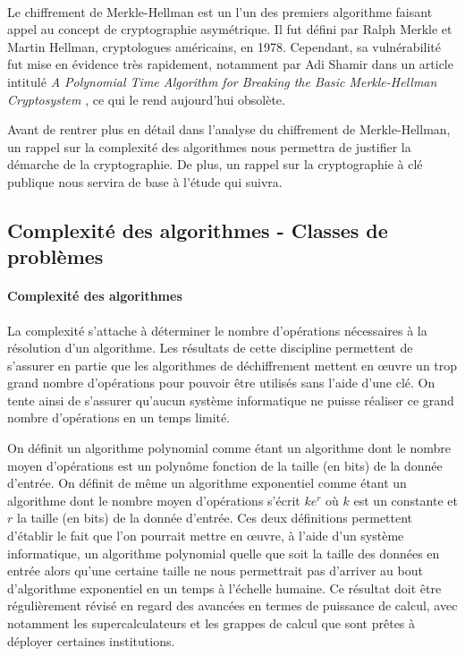 \documentclass[a4paper,10pt]{article}
\begin{document}
\paragraph{} Le chiffrement de Merkle-Hellman est un l'un des premiers algorithme faisant appel au concept de cryptographie asymétrique. Il fut défini par Ralph Merkle et Martin Hellman, cryptologues américains, en 1978. Cependant, sa vulnérabilité fut mise en évidence très rapidement, notamment par Adi Shamir dans un article intitulé \textit{A Polynomial Time Algorithm for Breaking the Basic Merkle-Hellman Cryptosystem} \cite{1056964}, ce qui le rend aujourd'hui obsolète.

Avant de rentrer plus en détail dans l'analyse du chiffrement de Merkle-Hellman, un rappel sur la complexité des algorithmes nous permettra de justifier la démarche de la cryptographie. De plus, un rappel sur la cryptographie à clé publique nous servira de base à l'étude qui suivra.

\subsection*{Complexité des algorithmes - Classes de problèmes}

\paragraph{Complexité des algorithmes} La complexité s'attache à déterminer le nombre d'opérations nécessaires à la résolution d'un algorithme. Les résultats de cette discipline permettent de s'assurer en partie que les algorithmes de déchiffrement mettent en œuvre un trop grand nombre d'opérations pour pouvoir être utilisés sans l'aide d'une clé. On tente ainsi de s'assurer qu'aucun système informatique ne puisse réaliser ce grand nombre d'opérations en un temps limité.

On définit un algorithme polynomial comme étant un algorithme dont le nombre moyen d'opérations est un polynôme fonction de la taille (en bits) de la donnée d'entrée. On définit de même un algorithme exponentiel comme étant un algorithme dont le nombre moyen d'opérations s'écrit $ke^{r}$ où $k$ est un constante et $r$ la taille (en bits) de la donnée d'entrée. Ces deux définitions permettent d'établir le fait que l'on pourrait mettre en œuvre, à l'aide d'un système informatique, un algorithme polynomial quelle que soit la taille des données en entrée alors qu'une certaine taille ne nous permettrait pas d'arriver au bout d'algorithme exponentiel en un temps à l'échelle humaine. Ce résultat doit être régulièrement révisé en regard des avancées en termes de puissance de calcul, avec notamment les supercalculateurs et les grappes de calcul que sont prêtes à déployer certaines institutions.
\end{document}
